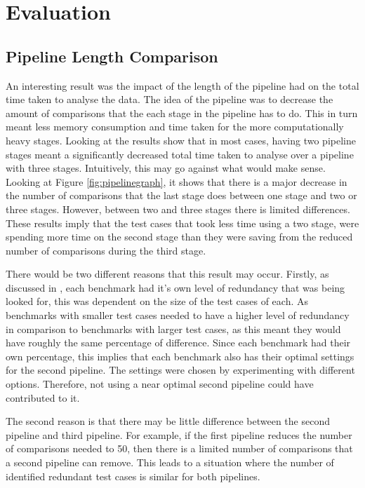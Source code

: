 \chapter{Evaluation}\label{C:evaluation}

\section{Pipeline Length Comparison}

An interesting result was the impact of the length of the pipeline had on the total time taken to analyse the data. The idea of the pipeline was to decrease the amount of comparisons that the each stage in the pipeline has to do. This in turn meant less memory consumption and time taken for the more computationally heavy stages. Looking at the results show that in most cases, having two pipeline stages meant a significantly decreased total time taken to analyse over a pipeline with three stages. Intuitively, this may go against what would make sense. Looking at Figure \ref{fig:pipelinegraph}, it shows that there is a major decrease in the number of comparisons that the last stage does between one stage and two or three stages. However, between two and three stages there is limited differences. These results imply that the test cases that took less time using a two stage, were spending more time on the second stage than they were saving from the reduced number of comparisons during the third stage. 

There would be two different reasons that this result may occur. Firstly, as discussed in , each benchmark had it's own level of redundancy that was being looked for, this was dependent on the size of the test cases of each. As benchmarks with smaller test cases needed to have a higher level of redundancy in comparison to benchmarks with larger test cases, as this meant they would have roughly the same percentage of difference. Since each benchmark had their own percentage, this implies that each benchmark also has their optimal settings for the second pipeline. The settings were chosen by experimenting with different options. Therefore, not using a near optimal second pipeline could have contributed to it. 

The second reason is that there may be little difference between the second pipeline and third pipeline. For example, if the first pipeline reduces the number of comparisons needed to 50, then there is a limited number of comparisons that a second pipeline can remove. This leads to a situation where the number of identified redundant test cases is similar for both pipelines.


